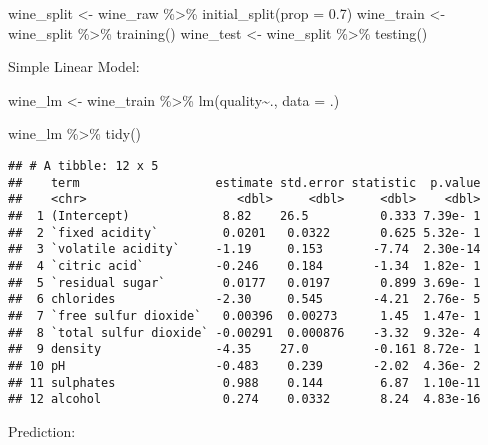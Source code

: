 \documentclass[
]{article}
\newenvironment{Shaded}{\begin{snugshade}}{\end{snugshade}}
\newcommand{\AttributeTok}[1]{\textcolor[rgb]{0.77,0.63,0.00}{#1}}
\newcommand{\FloatTok}[1]{\textcolor[rgb]{0.00,0.00,0.81}{#1}}
\newcommand{\FunctionTok}[1]{\textcolor[rgb]{0.00,0.00,0.00}{#1}}
\newcommand{\NormalTok}[1]{#1}
\newcommand{\OtherTok}[1]{\textcolor[rgb]{0.56,0.35,0.01}{#1}}
\newcommand{\SpecialCharTok}[1]{\textcolor[rgb]{0.00,0.00,0.00}{#1}}
\begin{document}
\begin{Shaded}
\begin{Highlighting}[]
\NormalTok{wine\_split }\OtherTok{\textless{}{-}}\NormalTok{ wine\_raw }\SpecialCharTok{\%\textgreater{}\%} \FunctionTok{initial\_split}\NormalTok{(}\AttributeTok{prop =} \FloatTok{0.7}\NormalTok{)}
\NormalTok{wine\_train }\OtherTok{\textless{}{-}}\NormalTok{ wine\_split }\SpecialCharTok{\%\textgreater{}\%} \FunctionTok{training}\NormalTok{()}
\NormalTok{wine\_test }\OtherTok{\textless{}{-}}\NormalTok{ wine\_split }\SpecialCharTok{\%\textgreater{}\%} \FunctionTok{testing}\NormalTok{()}
\end{Highlighting}
\end{Shaded}

Simple Linear Model:

\begin{Shaded}
\begin{Highlighting}[]
\NormalTok{wine\_lm }\OtherTok{\textless{}{-}}\NormalTok{ wine\_train }\SpecialCharTok{\%\textgreater{}\%} 
  \FunctionTok{lm}\NormalTok{(quality}\SpecialCharTok{\textasciitilde{}}\NormalTok{.,}
     \AttributeTok{data =}\NormalTok{ .)}

\NormalTok{wine\_lm }\SpecialCharTok{\%\textgreater{}\%} \FunctionTok{tidy}\NormalTok{()}
\end{Highlighting}
\end{Shaded}

\begin{verbatim}
## # A tibble: 12 x 5
##    term                   estimate std.error statistic  p.value
##    <chr>                     <dbl>     <dbl>     <dbl>    <dbl>
##  1 (Intercept)             8.82    26.5          0.333 7.39e- 1
##  2 `fixed acidity`         0.0201   0.0322       0.625 5.32e- 1
##  3 `volatile acidity`     -1.19     0.153       -7.74  2.30e-14
##  4 `citric acid`          -0.246    0.184       -1.34  1.82e- 1
##  5 `residual sugar`        0.0177   0.0197       0.899 3.69e- 1
##  6 chlorides              -2.30     0.545       -4.21  2.76e- 5
##  7 `free sulfur dioxide`   0.00396  0.00273      1.45  1.47e- 1
##  8 `total sulfur dioxide` -0.00291  0.000876    -3.32  9.32e- 4
##  9 density                -4.35    27.0         -0.161 8.72e- 1
## 10 pH                     -0.483    0.239       -2.02  4.36e- 2
## 11 sulphates               0.988    0.144        6.87  1.10e-11
## 12 alcohol                 0.274    0.0332       8.24  4.83e-16
\end{verbatim}

Prediction:
\end{document}
